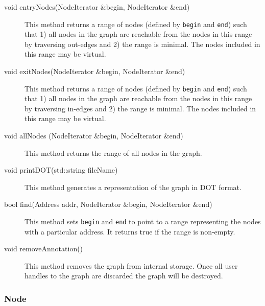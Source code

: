 \documentclass[12pt,titlepage]{article}
\begin{document}
\begin{description}

\item[void entryNodes(NodeIterator \&begin, NodeIterator \&end)] This
method returns a range of nodes (defined by \texttt{begin} and
\texttt{end}) such that 1) all nodes in the graph are reachable from
the nodes in this range by traversing out-edges and 2) the range is
minimal. The nodes included in this range may be virtual.
\item[void exitNodes(NodeIterator \&begin, NodeIterator \&end)] This
method returns a range of nodes (defined by \texttt{begin} and
\texttt{end}) such that 1) all nodes in the graph are reachable from
the nodes in this range by traversing in-edges and 2) the range is
minimal. The nodes included in this range may be virtual.
\item[void allNodes (NodeIterator \&begin, NodeIterator \&end)]
This method returns the range of all nodes in the graph.
\item[void printDOT(std::string fileName)]
This method generates a representation of the graph in DOT format.
\item[bool find(Address addr, NodeIterator \&begin, NodeIterator \&end)]
This method sets \texttt{begin} and \texttt{end} to point to a range
representing the nodes with a particular address. It returns true if
the range is non-empty. 
\item[void removeAnnotation()] This method removes the graph from
internal storage. Once all user handles to the graph are discarded the
graph will be destroyed.
\end{description}

\subsubsection{Node}
\end{document}
